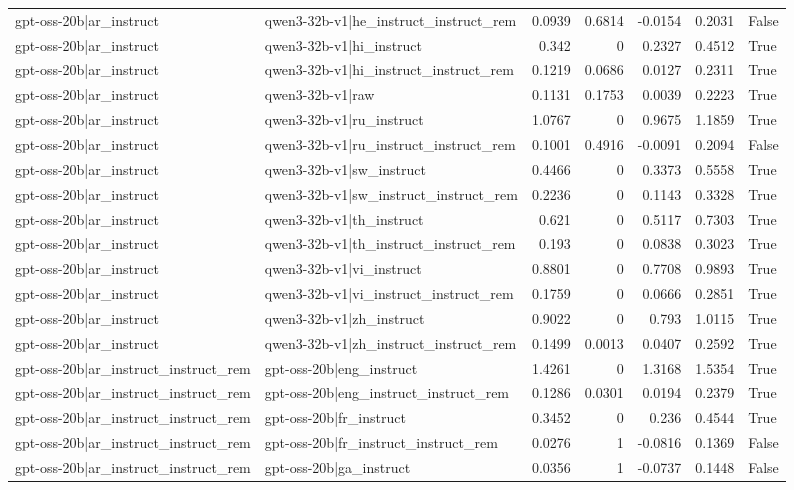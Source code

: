 \begin{table}
\begin{tabular}{l l r r r r l}
gpt-oss-20b|ar_instruct & qwen3-32b-v1|he_instruct_instruct_rem & 0.0939 & 0.6814 & -0.0154 & 0.2031 & False \\
gpt-oss-20b|ar_instruct & qwen3-32b-v1|hi_instruct & 0.342 & 0 & 0.2327 & 0.4512 & True \\
gpt-oss-20b|ar_instruct & qwen3-32b-v1|hi_instruct_instruct_rem & 0.1219 & 0.0686 & 0.0127 & 0.2311 & True \\
gpt-oss-20b|ar_instruct & qwen3-32b-v1|raw & 0.1131 & 0.1753 & 0.0039 & 0.2223 & True \\
gpt-oss-20b|ar_instruct & qwen3-32b-v1|ru_instruct & 1.0767 & 0 & 0.9675 & 1.1859 & True \\
gpt-oss-20b|ar_instruct & qwen3-32b-v1|ru_instruct_instruct_rem & 0.1001 & 0.4916 & -0.0091 & 0.2094 & False \\
gpt-oss-20b|ar_instruct & qwen3-32b-v1|sw_instruct & 0.4466 & 0 & 0.3373 & 0.5558 & True \\
gpt-oss-20b|ar_instruct & qwen3-32b-v1|sw_instruct_instruct_rem & 0.2236 & 0 & 0.1143 & 0.3328 & True \\
gpt-oss-20b|ar_instruct & qwen3-32b-v1|th_instruct & 0.621 & 0 & 0.5117 & 0.7303 & True \\
gpt-oss-20b|ar_instruct & qwen3-32b-v1|th_instruct_instruct_rem & 0.193 & 0 & 0.0838 & 0.3023 & True \\
gpt-oss-20b|ar_instruct & qwen3-32b-v1|vi_instruct & 0.8801 & 0 & 0.7708 & 0.9893 & True \\
gpt-oss-20b|ar_instruct & qwen3-32b-v1|vi_instruct_instruct_rem & 0.1759 & 0 & 0.0666 & 0.2851 & True \\
gpt-oss-20b|ar_instruct & qwen3-32b-v1|zh_instruct & 0.9022 & 0 & 0.793 & 1.0115 & True \\
gpt-oss-20b|ar_instruct & qwen3-32b-v1|zh_instruct_instruct_rem & 0.1499 & 0.0013 & 0.0407 & 0.2592 & True \\
gpt-oss-20b|ar_instruct_instruct_rem & gpt-oss-20b|eng_instruct & 1.4261 & 0 & 1.3168 & 1.5354 & True \\
gpt-oss-20b|ar_instruct_instruct_rem & gpt-oss-20b|eng_instruct_instruct_rem & 0.1286 & 0.0301 & 0.0194 & 0.2379 & True \\
gpt-oss-20b|ar_instruct_instruct_rem & gpt-oss-20b|fr_instruct & 0.3452 & 0 & 0.236 & 0.4544 & True \\
gpt-oss-20b|ar_instruct_instruct_rem & gpt-oss-20b|fr_instruct_instruct_rem & 0.0276 & 1 & -0.0816 & 0.1369 & False \\
gpt-oss-20b|ar_instruct_instruct_rem & gpt-oss-20b|ga_instruct & 0.0356 & 1 & -0.0737 & 0.1448 & False \\

\end{tabular}
\end{table}
